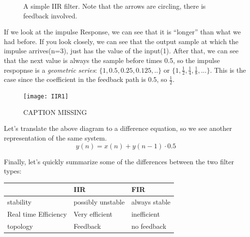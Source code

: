 \begin{figure}[htb]
  \centering
  \label{fig:IIRlowpass}

  \caption{A simple IIR filter. Note that the arrows are circling, there is feedback involved.}
\end{figure}


If we look at the impulse Response, we can see that it is  ``longer'' than what we had before. If you look closely, we can see that the output sample at which the impulse arrives(n=3), just has the value of the input(1). After that, we can see that the next value is always the sample before times 0.5, so the impulse respopnse is a \textit{geometric series}: $\{1,0.5,0.25,0.125,..\}$ or $\{1, \frac{1}{2}, \frac{1}{4}, \frac{1}{8}, ...\}$. This is the case since the coefficient in the feedback path is 0.5, so $\frac{1}{2}$.


\begin{figure}[H]
	\centering
	\texttt{[image: IIR1]}
	\caption[shortCaption]
	{CAPTION MISSING}
	\label{fig:label}
\end{figure}

Let's translate the above diagram to a difference equation, so we see another representation of the same system.
\begin{equation}
 	y(n) = x(n)+y(n-1) \cdot 0.5
 \end{equation}

Finally, let's quickly summarize some of the differences between the two filter types:
\begin{center}

\begin{tabular}{l|l|l}

& \textbf{IIR} & \textbf{FIR} \\
\hline
stability & possibly unstable & always stable \\
Real time Efficiency & Very efficient & inefficient \\
topology & Feedback & no feedback \\

\end{tabular}
\end{center}

